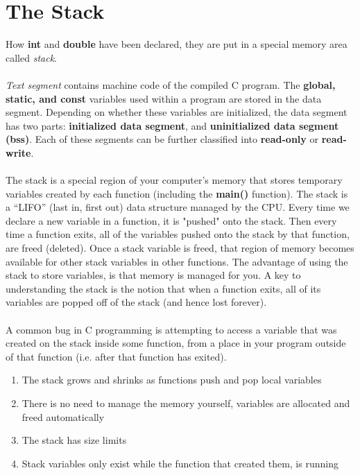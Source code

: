 \documentclass{article}
\begin{document}
\section{The Stack}
How \textbf{int} and \textbf{double} have been declared, they are put in a special memory area called \textit{stack}.\\
\\ \textit{Text segment} contains machine code of the compiled C program.
The \textbf{global, static, and const} variables used within a program are stored in the data segment. Depending on whether these variables are initialized, the data segment has two parts: \textbf{initialized
data segment}, and \textbf{uninitialized data segment (bss)}. Each of these segments can be further classified into \textbf{read-only} or \textbf{read-write}.\\
\\ The stack is a special region of your computer’s memory that stores temporary variables created by each function (including the \textbf{main()} function). 
The stack is a ``LIFO'' (last in, first out) data structure managed by the CPU. 
Every time we declare a new variable in a function, it is "pushed" onto the stack. 
Then every time a function exits, all of the variables pushed onto the stack by that function, are freed (deleted). 
Once a stack variable is freed, that region of memory becomes available for other stack variables in other functions. The advantage of using the stack to store variables, is that memory is managed for you. 
A key to understanding the stack is the notion that when a function exits, all of its variables are popped off of the stack (and hence lost forever). \\
\\ A common bug in C programming is attempting to access a variable that was created on the stack inside some function, from a place in your program outside of that function (i.e. after that function has exited).\par
\begin{enumerate}
    \item The stack grows and shrinks as functions push and pop local variables
    \item There is no need to manage the memory yourself, variables are allocated and freed automatically
    \item The stack has size limits
    \item Stack variables only exist while the function that created them, is running
\end{enumerate}
\end{document}
